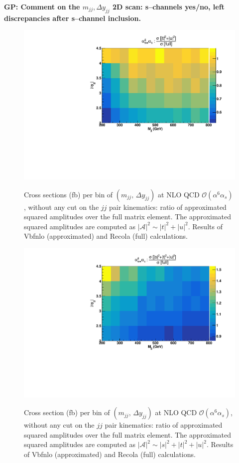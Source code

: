 {\bf GP: Comment on the $m_{jj}, \Delta y_{jj}$ 2D scan: s--channels yes/no, left discrepancies after s--channel inclusion.}
\begin{figure}[h]
\centering
{\includegraphics[scale=0.39]{figures/scanfigures/a6as_vbfnloVSrecola_tu.pdf}} 
\caption{Cross sections (fb) per bin of $(m_{jj},\,\Delta y_{jj})$ at NLO QCD $\mathcal{O}(\alpha^6\alpha_s)$, without any cut on the $jj$ pair kinematics: ratio of approximated squared amplitudes over the full matrix element. The approximated squared amplitudes are computed as $|\mathcal{A}|^2 \sim |t|^2 + |u|^2$. Results of {\sc Vbfnlo} (approximated) and {\sc Recola} (full) calculations.}\label{fig:ratio2d_NLO}
\end{figure}

\begin{figure}[hbt]
\centering
{\includegraphics[scale=0.39]{figures/scanfigures/a6as_vbfnloVSrecola_stu.pdf}}
\caption{Cross section (fb) per bin of $(m_{jj},\,\Delta y_{jj})$ at NLO QCD $\mathcal{O}(\alpha^6\alpha_s)$, without any cut on the $jj$ pair kinematics:  ratio of approximated squared amplitudes over the full matrix element. The approximated squared amplitudes are computed as $|\mathcal{A}|^2 \sim |s|^2 + |t|^2 + |u|^2$. Results of {\sc Vbfnlo} (approximated) and {\sc Recola} (full) calculations.}\label{fig:mjjdyjj_2d_NLO}
\end{figure}

